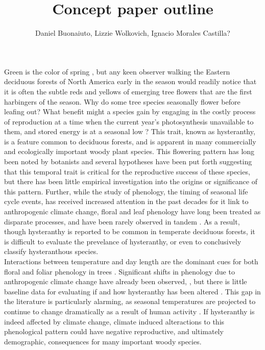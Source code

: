 \documentclass{article}
\begin{document}

\title{Concept paper outline}
\author{Daniel Buonaiuto, Lizzie Wolkovich, Ignacio Morales Castilla?}
\maketitle{}
\indent Green is the color of spring \citep{Schwartz1998}, but any keen observer walking the Eastern deciduous forests of North America early in the season would readily notice that it is often the subtle reds and yellows of emerging tree flowers that are the first harbingers of the season. Why do some tree species seasonally flower before leafing out? What benefit might a species gain by engaging in the costly process of reproduction at a time when the current year's photosynthesis unavailable to them, and stored energy is at a seasonal low \citep*{Hoch2003,Pfanz2002}? This trait, known as hysteranthy, is a feature common to deciduous forests, and is apparent in many commercially and ecologically important woody plant species. This flowering pattern has long been noted by botanists \citep{Rathcke1985} and several hypotheses have been put forth suggesting that this temporal trait is critical for the reproductive success of these species, but there has been little empirical investigation into the origins or significance of this pattern. Further, while the study of phenology, the timing of seasonal life cycle events, has received increased attention in the past decades for it link to anthropogenic climate change, floral and leaf phenology have long been treated as disparate processes, and have been rarely observed in tandem \citep{Wolkovich2014}. As a result, though hysteranthy is reported to be common in temperate deciduous forests, it is difficult to evaluate the prevelance of hysteranthy, or even to conclusively classify hysteranthous species.\\
\indent Interactions between temperature and day length are the dominant cues for both floral and foliar phenology in trees \citep{Forrest2010}. Significant shifts in phenology due to anthropogenic climate change have already been observed, \citep{Menzel2006}, but there is little baseline data for evaluating if and how hysteranthy has been altered \citep{Lechowicz1995}. This gap in the literature is particularly alarming, as seasonal temperatures are projected to continue to change dramatically as a result of human activity \citep{Raftery2017}. If hysteranthy is indeed affected by climate change, climate induced alteractions to this phenological pattern could have negative reproductive, and ultimately demographic, consequences for many important woody species.\\
\end{document}
